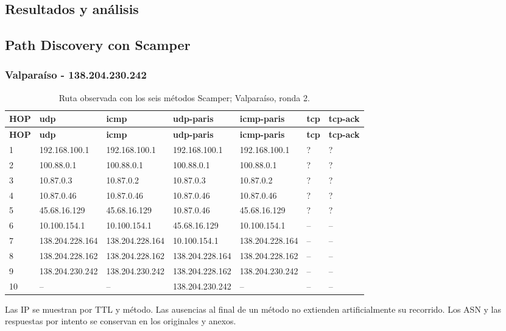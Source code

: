 \begin{landscape}
\section{Resultados y análisis}\label{sec:resultados}
\subsection{Path Discovery con Scamper}\label{sec:scamper}
\subsubsection{Valparaíso - 138.204.230.242}
\begingroup
\fontsize{9}{11}\selectfont
\begin{longtable}{p{0.95cm}p{3.725cm}p{3.725cm}p{3.725cm}p{3.725cm}p{3.725cm}p{3.725cm}}
\caption{Ruta observada con los seis métodos Scamper; Valparaíso, ronda 2.}\label{tabla1:138.204.230.242} \\
\toprule
\textbf{HOP} & \textbf{udp} & \textbf{icmp} & \textbf{udp-paris} & \textbf{icmp-paris} & \textbf{tcp} & \textbf{tcp-ack} \\ \midrule
\endfirsthead
\toprule
\textbf{HOP} & \textbf{udp} & \textbf{icmp} & \textbf{udp-paris} & \textbf{icmp-paris} & \textbf{tcp} & \textbf{tcp-ack} \\ \midrule
\endhead
1 & 192.168.100.1 & 192.168.100.1 & 192.168.100.1 & 192.168.100.1 & ? & ? \\
2 & 100.88.0.1 & 100.88.0.1 & 100.88.0.1 & 100.88.0.1 & ? & ? \\
3 & 10.87.0.3 & 10.87.0.2 & 10.87.0.3 & 10.87.0.2 & ? & ? \\
4 & 10.87.0.46 & 10.87.0.46 & 10.87.0.46 & 10.87.0.46 & ? & ? \\
5 & 45.68.16.129 & 45.68.16.129 & 10.87.0.46 & 45.68.16.129 & ? & ? \\
6 & 10.100.154.1 & 10.100.154.1 & 45.68.16.129 & 10.100.154.1 & -- & -- \\
7 & 138.204.228.164 & 138.204.228.164 & 10.100.154.1 & 138.204.228.164 & -- & -- \\
8 & 138.204.228.162 & 138.204.228.162 & 138.204.228.164 & 138.204.228.162 & -- & -- \\
9 & 138.204.230.242 & 138.204.230.242 & 138.204.228.162 & 138.204.230.242 & -- & -- \\
10 & -- & -- & 138.204.230.242 & -- & -- & -- \\
\bottomrule
\end{longtable}
\endgroup
Las IP se muestran por TTL y método. Las ausencias al final de un método no extienden artificialmente su recorrido. Los ASN y las respuestas por intento se conservan en los originales y anexos.

\end{landscape}
